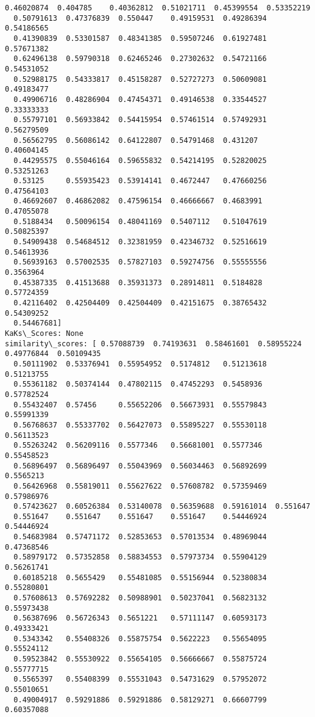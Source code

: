 \documentclass[11pt]{article}
\begin{document}
\begin{Verbatim}[commandchars=\\\{\}]
  0.46020874  0.404785    0.40362812  0.51021711  0.45399554  0.53352219
  0.50791613  0.47376839  0.550447    0.49159531  0.49286394  0.54186565
  0.41390839  0.53301587  0.48341385  0.59507246  0.61927481  0.57671382
  0.62496138  0.59790318  0.62465246  0.27302632  0.54721166  0.54531052
  0.52988175  0.54333817  0.45158287  0.52727273  0.50609081  0.49183477
  0.49906716  0.48286904  0.47454371  0.49146538  0.33544527  0.33333333
  0.55797101  0.56933842  0.54415954  0.57461514  0.57492931  0.56279509
  0.56562795  0.56086142  0.64122807  0.54791468  0.431207    0.40604145
  0.44295575  0.55046164  0.59655832  0.54214195  0.52820025  0.53251263
  0.53125     0.55935423  0.53914141  0.4672447   0.47660256  0.47564103
  0.46692607  0.46862082  0.47596154  0.46666667  0.4683991   0.47055078
  0.5188434   0.50096154  0.48041169  0.5407112   0.51047619  0.50825397
  0.54909438  0.54684512  0.32381959  0.42346732  0.52516619  0.54613936
  0.56939163  0.57002535  0.57827103  0.59274756  0.55555556  0.3563964
  0.45387335  0.41513688  0.35931373  0.28914811  0.5184828   0.57724359
  0.42116402  0.42504409  0.42504409  0.42151675  0.38765432  0.54309252
  0.54467681]
KaKs\_Scores: None
similarity\_scores: [ 0.57088739  0.74193631  0.58461601  0.58955224  0.49776844  0.50109435
  0.50111902  0.53376941  0.55954952  0.5174812   0.51213618  0.51213755
  0.55361182  0.50374144  0.47802115  0.47452293  0.5458936   0.57782524
  0.55432407  0.57456     0.55652206  0.56673931  0.55579843  0.55991339
  0.56768637  0.55337702  0.56427073  0.55895227  0.55530118  0.56113523
  0.55263242  0.56209116  0.5577346   0.56681001  0.5577346   0.55458523
  0.56896497  0.56896497  0.55043969  0.56034463  0.56892699  0.5565213
  0.56426968  0.55819011  0.55627622  0.57608782  0.57359469  0.57986976
  0.57423627  0.60526384  0.53140078  0.56359688  0.59161014  0.551647
  0.551647    0.551647    0.551647    0.551647    0.54446924  0.54446924
  0.54683984  0.57471172  0.52853653  0.57013534  0.48969044  0.47368546
  0.58979172  0.57352858  0.58834553  0.57973734  0.55904129  0.56261741
  0.60185218  0.5655429   0.55481085  0.55156944  0.52380834  0.55280801
  0.57608613  0.57692282  0.50988901  0.50237041  0.56823132  0.55973438
  0.56387696  0.56726343  0.5651221   0.57111147  0.60593173  0.49333421
  0.5343342   0.55408326  0.55875754  0.5622223   0.55654095  0.55524112
  0.59523842  0.55530922  0.55654105  0.56666667  0.55875724  0.55777715
  0.5565397   0.55408399  0.55531043  0.54731629  0.57952072  0.55010651
  0.49004917  0.59291886  0.59291886  0.58129271  0.66607799  0.60357088

\end{Verbatim}
\end{document}
